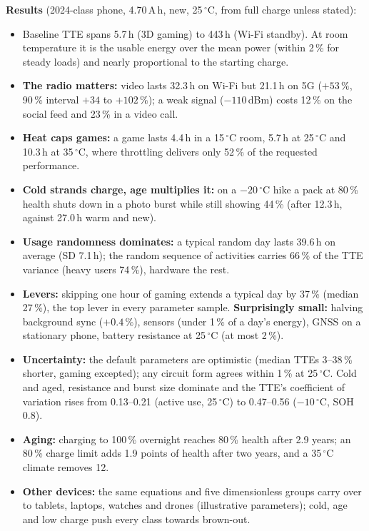 \smallskip\noindent\textbf{Results} (2024-class phone, 4.70\,A\,h, new, 25\,$^\circ$C, from full charge unless stated):
\begin{itemize}
  \item Baseline TTE spans 5.7\,h (3D gaming) to 443\,h (Wi-Fi standby). At room temperature it is the usable
  energy over the mean power (within 2\,\% for steady loads) and nearly proportional to the starting charge.
  \item \textbf{The radio matters:} video lasts 32.3\,h on Wi-Fi but 21.1\,h on 5G ($+53\,\%$, 90\,\% interval
  $+34$ to $+102\,\%$); a weak signal ($-110$\,dBm) costs 12\,\% on the social feed and 23\,\% in a video call.
  \item \textbf{Heat caps games:} a game lasts 4.4\,h in a 15\,$^\circ$C room, 5.7\,h at 25\,$^\circ$C and
  10.3\,h at 35\,$^\circ$C, where throttling delivers only 52\,\% of the requested performance.
  \item \textbf{Cold strands charge, age multiplies it:} on a $-20\,^\circ$C hike a pack at 80\,\% health shuts
  down in a photo burst while still showing 44\,\% (after 12.3\,h, against 27.0\,h warm and new).
  \item \textbf{Usage randomness dominates:} a typical random day lasts 39.6\,h on average (SD 7.1\,h); the
  random sequence of activities carries 66\,\% of the TTE variance (heavy users 74\,\%), hardware the rest.
  \item \textbf{Levers:} skipping one hour of gaming extends a typical day by 37\,\% (median 27\,\%), the top lever
  in every parameter sample. \textbf{Surprisingly small:} halving background sync ($+0.4\,\%$), sensors (under
  1\,\% of a day's energy), GNSS on a stationary phone, battery resistance at 25\,$^\circ$C (at most 2\,\%).
  \item \textbf{Uncertainty:} the default parameters are optimistic (median TTEs 3--38\,\% shorter, gaming
  excepted); any circuit form agrees within 1\,\% at 25\,$^\circ$C. Cold and aged, resistance and burst size
  dominate and the TTE's coefficient of variation rises from 0.13--0.21 (active use, 25\,$^\circ$C) to 0.47--0.56
  ($-10\,^\circ$C, SOH 0.8).
  \item \textbf{Aging:} charging to 100\,\% overnight reaches 80\,\% health after 2.9 years; an 80\,\% charge limit
  adds 1.9 points of health after two years, and a 35\,$^\circ$C climate removes 12.
  \item \textbf{Other devices:} the same equations and five dimensionless groups carry over to tablets, laptops,
  watches and drones (illustrative parameters); cold, age and low charge push every class towards brown-out.
\end{itemize}

